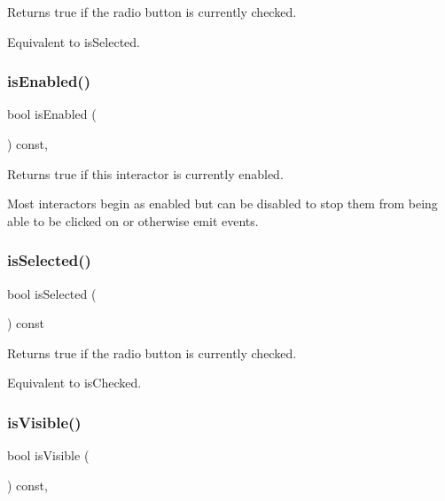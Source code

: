 Returns true if the radio button is currently checked. 

Equivalent to is\+Selected. \mbox{\label{classsgl_1_1GInteractor_aacb819fb241851fd9fc045271baa4034}} 
\subsubsection{\texorpdfstring{is\+Enabled()}{isEnabled()}}
{\footnotesize\ttfamily bool is\+Enabled (\begin{DoxyParamCaption}{ }\end{DoxyParamCaption}) const\hspace{0.3cm}{\ttfamily [virtual]}, {\ttfamily [inherited]}}



Returns true if this interactor is currently enabled. 

Most interactors begin as enabled but can be disabled to stop them from being able to be clicked on or otherwise emit events. \mbox{\label{classsgl_1_1GRadioButton_a56a065a2c20a230931de0ed98019d8fb}} 
\subsubsection{\texorpdfstring{is\+Selected()}{isSelected()}}
{\footnotesize\ttfamily bool is\+Selected (\begin{DoxyParamCaption}{ }\end{DoxyParamCaption}) const\hspace{0.3cm}{\ttfamily [virtual]}}



Returns true if the radio button is currently checked. 

Equivalent to is\+Checked. \mbox{\label{classsgl_1_1GInteractor_a9d8a6cfb13917785c143e74d40e4e2be}} 
\subsubsection{\texorpdfstring{is\+Visible()}{isVisible()}}
{\footnotesize\ttfamily bool is\+Visible (\begin{DoxyParamCaption}{ }\end{DoxyParamCaption}) const\hspace{0.3cm}{\ttfamily [virtual]}, {\ttfamily [inherited]}}



